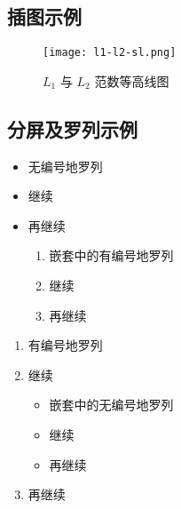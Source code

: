 \documentclass[UTF8, zihao = 5]{article}
\begin{document}
\clp  %

\subsection{插图示例}

\begin{figure}[H]
  \centering
  \texttt{[image: l1-l2-sl.png]}
  \caption{$L_1$ 与 $L_2$ 范数等高线图}
\end{figure}

\clp  %

\subsection{分屏及罗列示例}

\begin{minipage}{0.5\linewidth}
  \begin{itemize}
    \item 无编号地罗列
    \item 继续
    \item 再继续
    \begin{enumerate}
      \item 嵌套中的有编号地罗列
      \item 继续
      \item 再继续
    \end{enumerate}
  \end{itemize}
\end{minipage}%
\begin{minipage}{0.5\linewidth}
  \begin{enumerate}
    \item 有编号地罗列
    \item 继续
    \begin{itemize}
      \item 嵌套中的无编号地罗列
      \item 继续
      \item 再继续
    \end{itemize}
    \item 再继续
  \end{enumerate}
\end{minipage}

\clp  %
\thispagestyle{empty}
\null\vfill

\centering
\scalebox{3}{谢谢！}

\vfill\null

\clp
\end{document}
